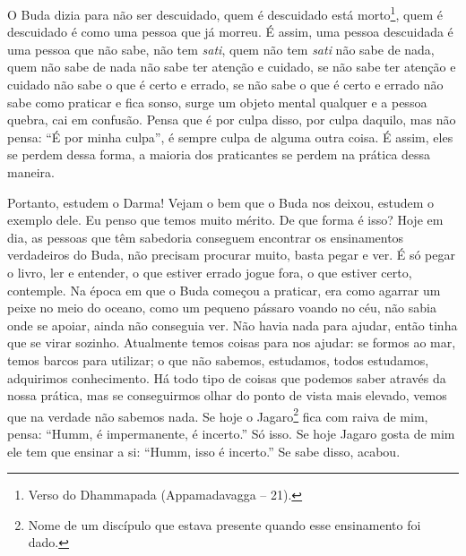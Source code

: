 O Buda dizia para não ser descuidado, quem é descuidado está
morto\footnote{Verso do Dhammapada (Appamadavagga – 21).}, quem é
descuidado é como uma pessoa que já morreu. É assim, uma pessoa
descuidada é uma pessoa que não sabe, não tem \textit{sati}, quem não
tem \textit{sati} não sabe de nada, quem não sabe de nada não sabe ter
atenção e cuidado, se não sabe ter atenção e cuidado não sabe o que é
certo e errado, se não sabe o que é certo e errado não sabe como
praticar e fica sonso, surge um objeto mental qualquer e a pessoa
quebra, cai em confusão. Pensa que é por culpa disso, por culpa
daquilo, mas não pensa: “É por minha culpa”, é sempre culpa de alguma
outra coisa. É assim, eles se perdem dessa forma, a maioria dos
praticantes se perdem na prática dessa maneira. 

Portanto, estudem o Darma! Vejam o bem que o Buda nos deixou,
estudem o exemplo dele. Eu penso que temos muito mérito. De que forma é
isso? Hoje em dia, as pessoas que têm sabedoria conseguem encontrar os
ensinamentos verdadeiros do Buda, não precisam procurar muito, basta
pegar e ver. É só pegar o livro, ler e entender, o que estiver errado
jogue fora, o que estiver certo, contemple. Na época em que o Buda
começou a praticar, era como agarrar um peixe no meio do oceano, como
um pequeno pássaro voando no céu, não sabia onde se apoiar, ainda não
conseguia ver. Não havia nada para ajudar, então tinha que se virar
sozinho. Atualmente temos coisas para nos ajudar: se formos ao mar,
temos barcos para utilizar; o que não sabemos, estudamos, todos
estudamos, adquirimos conhecimento. Há todo tipo de coisas que podemos
saber através da nossa prática, mas se conseguirmos olhar do ponto de
vista mais elevado, vemos que na verdade não sabemos nada. Se hoje o
Jagaro\footnote{Nome de um discípulo que estava presente quando esse
ensinamento foi dado.} fica com raiva de mim, pensa: “Humm, é
impermanente, é incerto.” Só isso. Se hoje Jagaro gosta de mim ele tem
que ensinar a si: “Humm, isso é incerto.” Se sabe disso, acabou. 

